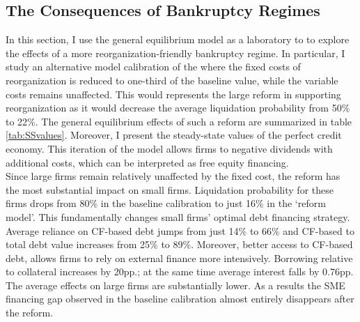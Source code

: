 \documentclass[12pt]{article}
\begin{document}
\subsection{The Consequences of Bankruptcy Regimes}
In this section, I use the general equilibrium model as a laboratory to  to explore the effects of a more reorganization-friendly bankruptcy regime. In particular, I study an alternative model calibration of the where the fixed costs of reorganization is reduced to one-third of the baseline value, while the variable costs remains unaffected. This would represents the large reform in supporting reorganization as it would decrease the average liquidation probability from 50\% to 22\%. The general equilibrium effects of such a reform are summarized in table \ref{tab:SSvalues}. Moreover, I present the steady-state values of the perfect credit economy. This iteration of the model allows firms to negative dividends with additional costs, which can be interpreted as free equity financing. \vspace{3mm} \\
Since large firms remain relatively unaffected by the fixed cost, the reform has the most substantial impact on small firms. Liquidation probability for these firms drops from 80\% in the baseline calibration to just 16\% in the `reform model'. This fundamentally changes small firms' optimal debt financing strategy. Average reliance on CF-based debt jumps from just 14\% to 66\% and CF-based to total debt value increases from 25\% to 89\%. Moreover, better access to CF-based debt, allows firms to rely on external finance more intensively. Borrowing relative to collateral increases by 20pp.; at the same time average interest falls by 0.76pp. The average effects on large firms are substantially lower. As a results the SME financing gap observed in the baseline calibration almost entirely disappears after the reform.  \\
\end{document}
